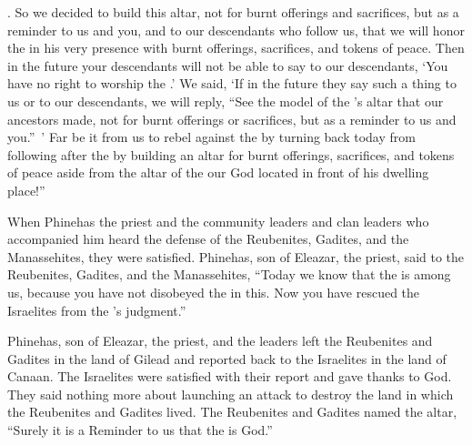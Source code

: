 {{}.
So
we decided
to build
this altar,
not
for burnt offerings
and sacrifices,
but
as a reminder
to us and you, and to our descendants
who follow
us,
that we
will honor
the {}
in his very presence
with burnt offerings,
sacrifices,
and tokens of peace.
Then in the future
your descendants
will not be
able to say
to our descendants,
‘You have no
right to worship
the {}.’
We said,
‘If
in the future
they say
such a thing to
us or to our descendants, we
will reply,
“See
the
model
of the
{}’s
altar
that
our ancestors
made,
not
for burnt offerings
or
sacrifices,
but
as a reminder to us and you.” ’
Far be it
from
us to rebel
against the
{}
by turning back
today
from following after
the {}
by building
an altar
for burnt offerings,
sacrifices,
and tokens of peace
aside
from the altar
of the {}
our God
located
in front
of his dwelling place!”
\par }{\PP {}When
Phinehas
the priest
and the community
leaders
and clan
leaders
who
accompanied
him heard
the defense
of the Reubenites,
Gadites,
and the Manassehites,
they were satisfied.
Phinehas,
son
of Eleazar,
the priest,
said
to
the Reubenites,
Gadites,
and the Manassehites, “Today
we know
that
the {}
is among
us, because you have
not
disobeyed
the {}
in this.
Now
you have rescued
the
Israelites
from the
{}’s
judgment.”
\par }{\PP {}Phinehas,
son
of Eleazar,
the priest,
and the leaders
left the Reubenites
and Gadites
in the land
of Gilead
and reported
back
to
the Israelites
in the land
of Canaan.
The Israelites
were satisfied
with their report
and gave thanks
to God.
They said
nothing
more about launching
an attack
to destroy
the
land
in which
the Reubenites
and Gadites
lived.
The Reubenites
and Gadites
named
the altar,
“Surely
it is
a Reminder
to us that
the {}
is God.”

}
